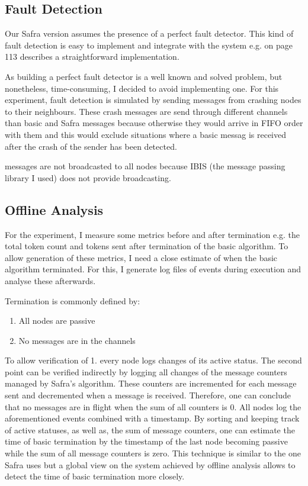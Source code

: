 \subsection{Fault Detection}
Our Safra version assumes the presence of a perfect fault detector.
This kind of fault detection is easy to implement and integrate with the system e.g.
\cite{Fokkink:2018} on page 113 describes a straightforward implementation.

As building a perfect fault detector is a well known and solved problem, but nonetheless, time-consuming, I decided to avoid implementing one.
For this experiment, fault detection is simulated by sending  messages from crashing nodes to their neighbours. 
These crash messages are send through different channels than basic and Safra messages because otherwise they would arrive in FIFO order with them and this would exclude situations where a basic messag is received after the crash of the sender has been detected.

 messages are not broadcasted to all nodes because IBIS (the message passing library I used) does not provide broadcasting.  

\subsection{Offline Analysis}
\label{ssec:offline-analysis}
For the experiment, I measure some metrics before and after termination e.g. the total token count and tokens sent after termination of the basic algorithm.
To allow generation of these metrics, I need a close estimate of when the basic algorithm terminated.
For this, I generate log files of events during execution and analyse these afterwards.

Termination is commonly defined by:
\begin{enumerate}
	\item All nodes are passive
	\item No messages are in the channels
\end{enumerate}
To allow verification of 1. every node logs changes of its active status.
The second point can be verified indirectly by logging all changes of the message counters managed by Safra's algorithm.
These counters are incremented for each message sent and decremented when a message is received.
Therefore, one can conclude that no messages are in flight when the sum of all counters is 0.
All nodes log the aforementioned events combined with a timestamp.
By sorting and keeping track of active statuses, as well as, the sum of message counters, one can estimate the time of basic termination by the timestamp of the last node becoming passive while the sum of all message counters is zero.
This technique is similar to the one Safra uses but a global view on the system achieved by offline analysis allows to detect the time of basic termination more closely.

